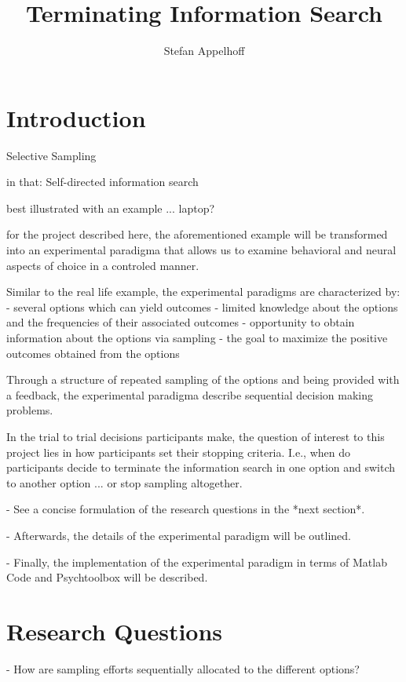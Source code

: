 \documentclass[
	12pt,
	oneside,
	bibliography=totocnumbered]{scrartcl}
\title{Terminating Information Search}
\author{Stefan Appelhoff}
\begin{document}
\maketitle
\tableofcontents



\section{Introduction}

Selective Sampling

in that: Self-directed information search

best illustrated with an example ... laptop?

for the project described here, the aforementioned example will be transformed into an experimental paradigma that allows us to examine behavioral and neural aspects of choice in a controled manner.

Similar to the real life example, the experimental paradigms are characterized by:
- several options which can yield outcomes
- limited knowledge about the options and the frequencies of their associated outcomes
- opportunity to obtain information about the options via sampling
- the goal to maximize the positive outcomes obtained from the options

Through a structure of repeated sampling of the options and being provided with a feedback, the experimental paradigma describe sequential decision making problems.

In the trial to trial decisions participants make, the question of interest to this project lies in how participants set their stopping criteria. I.e., when do participants decide to terminate the information search in one option and switch to another option ... or stop sampling altogether. 

- See a concise formulation of the research questions in the *next section*.

- Afterwards, the details of the experimental paradigm will be outlined.

- Finally, the implementation of the experimental paradigm in terms of Matlab Code and Psychtoolbox will be described.





\section{Research Questions}
- How are sampling efforts sequentially allocated to the different options?
\end{document}
